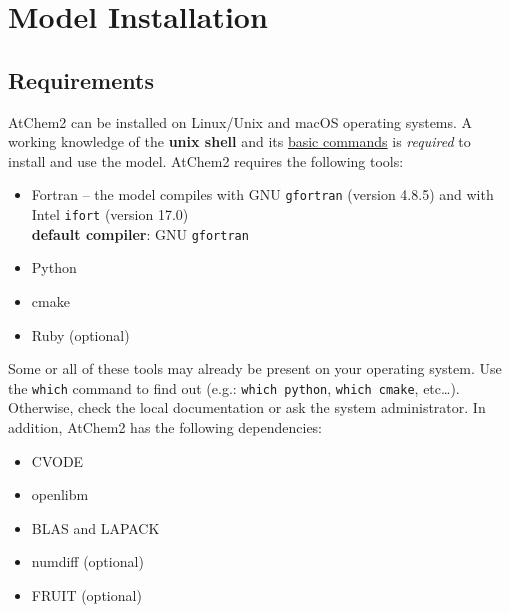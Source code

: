 %
%
%
%

\chapter{Model Installation} \label{ch:installation}

\section{Requirements} \label{sec:requirements}

AtChem2 can be installed on Linux/Unix and macOS operating systems. A
working knowledge of the \textbf{unix shell} and its
\href{https://swcarpentry.github.io/shell-novice/reference/}{basic commands}
is \emph{required} to install and use the model. AtChem2 requires the
following tools:

\begin{itemize}
\item Fortran -- the model compiles with GNU \texttt{gfortran} (version 4.8.5) and
  with Intel \texttt{ifort} (version 17.0)\\
  \textbf{default compiler}: GNU \texttt{gfortran}
\item Python
\item cmake
\item Ruby (optional)
\end{itemize}

Some or all of these tools may already be present on your operating
system. Use the \texttt{which} command to find out (e.g.:
\verb|which python|, \verb|which cmake|, etc\ldots). Otherwise, check
the local documentation or ask the system administrator. In addition,
AtChem2 has the following dependencies:

\begin{itemize}
\item CVODE
\item openlibm
\item BLAS and LAPACK
\item numdiff (optional)
\item FRUIT (optional)
\end{itemize}

